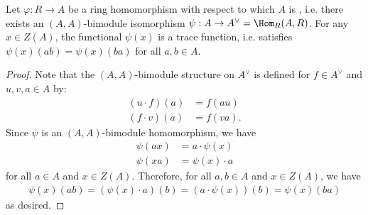 \begin{lemma} \label{lemma:symmetric_self_duality_on_a_ring_sends_center_elements_to_trace_functionals}
    Let $\varphi: R \to A$ be a ring homomorphism with respect to which $A$ is , i.e. there exists an $(A,A)$-bimodule isomorphism $\psi: A \to A^\vee = \Hom_R(A,R)$. For any $x \in Z(A)$, the functional $\psi(x)$ is a trace function, i.e. satisfies $\psi(x)(ab) = \psi(x)(ba)$ for all $a,b \in A$.
\end{lemma}
\begin{proof}
    Note that the $(A, A)$-bimodule structure on $A^\vee$ is defined for $f \in A^\vee$ and $u, v, a \in A$ by:
    \begin{align*}
        (u \cdot f)(a) &= f(au) \\
        (f \cdot v)(a) &= f(va).
    \end{align*}
    Since $\psi$ is an $(A,A)$-bimodule homomorphism, we have
    \begin{align*}
        \psi(ax) &=  a \cdot \psi(x)\\
        \psi(xa) &=  \psi(x) \cdot a
    \end{align*}
    for all $a \in A$ and $x \in Z(A)$. Therefore, for all $a,b \in A$ and $x \in Z(A)$, we have
    \begin{align*}
        \psi(x)(ab) = (\psi(x) \cdot a)(b) = (a \cdot \psi(x))(b) = \psi(x)(ba)
    \end{align*}
    as desired.
\end{proof}